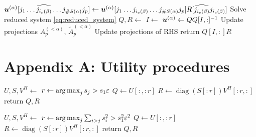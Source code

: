 \documentclass[a4wide]{article}
\begin{document}
\begin{algorithm}
\begin{algorithmic}[1]
      \State $ {\boldsymbol{u}}^{(\alpha)}[j_1 \dots \widehat{j_{i_c(\beta)}} \dots j_{\# S(\alpha)} j_p]
      \leftarrow {\boldsymbol{u}}^{(\alpha)} [j_1 \dots j_{i_c(\beta)} \dots j_{\# S(\alpha)} j_p] R[\widehat{j_{i_c(\beta)}} j_{i_c(\beta)}]$
      \Statex {}
    \EndFor
    \Statex {}
    \State Solve reduced system \eqref{eq:reduced_system}
    \State $Q,R \leftarrow $ 
    \State $I \leftarrow $ 
    \State ${\boldsymbol{u}}^{(\alpha)} \leftarrow Q Q[I, :]^{-1}$
    \State Update projections $A^{(<\alpha)}_{p}$, $\tilde{A}^{(<\alpha)}_{p}$
    \State Update projections of RHS
    \State return $Q[I, :] R$

  \EndIf
\EndProcedure
\end{algorithmic}
\end{algorithm}

\newpage

\section{Appendix A: Utility procedures}

\begin{algorithm}
\caption{SVD based rank truncation - 2-norm}

\begin{algorithmic}[1]
\State $U, S, V^H \leftarrow$ 
\State $r \leftarrow \operatorname*{arg\,max}_{j} s_j > s_1 \varepsilon$
\State $ Q \leftarrow U[\colon, \colon r]$
\State $ R \leftarrow \operatorname{diag}(S[\colon r]) V^H[\colon r, \colon]$
\State return $Q,R$
\EndProcedure
\end{algorithmic}
\end{algorithm}

\begin{algorithm}
\caption{SVD based rank truncation - Frobenius norm}
\begin{algorithmic}[1]
\State $U, S, V^H \leftarrow$ 
\State $r \leftarrow \operatorname*{arg\,max}_{j} \sum_{i>j} s_i^2 > s_1^2 \varepsilon^2 $
\State $ Q \leftarrow U[\colon, \colon r]$
\State $ R \leftarrow \operatorname{diag}(S[\colon r]) V^H[\colon r, \colon]$
\State return $Q,R$
\EndProcedure
\end{algorithmic}
\end{algorithm}
\end{document}
